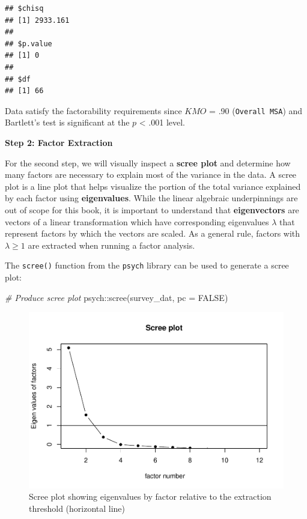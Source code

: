 \documentclass[
]{book}
\newenvironment{Shaded}{\begin{snugshade}}{\end{snugshade}}
\newcommand{\AttributeTok}[1]{\textcolor[rgb]{0.77,0.63,0.00}{#1}}
\newcommand{\CommentTok}[1]{\textcolor[rgb]{0.56,0.35,0.01}{\textit{#1}}}
\newcommand{\ConstantTok}[1]{\textcolor[rgb]{0.00,0.00,0.00}{#1}}
\newcommand{\FunctionTok}[1]{\textcolor[rgb]{0.00,0.00,0.00}{#1}}
\newcommand{\NormalTok}[1]{#1}
\newcommand{\SpecialCharTok}[1]{\textcolor[rgb]{0.00,0.00,0.00}{#1}}
\begin{document}
\begin{verbatim}
## $chisq
## [1] 2933.161
## 
## $p.value
## [1] 0
## 
## $df
## [1] 66
\end{verbatim}

Data satisfy the factorability requirements since \(KMO\) = .90 (\texttt{Overall\ MSA}) and Bartlett's test is significant at the \(p\) \textless{} .001 level.

\textbf{Step 2: Factor Extraction}

For the second step, we will visually inspect a \textbf{scree plot} and determine how many factors are necessary to explain most of the variance in the data. A scree plot is a line plot that helps visualize the portion of the total variance explained by each factor using \textbf{eigenvalues}. While the linear algebraic underpinnings are out of scope for this book, it is important to understand that \textbf{eigenvectors} are vectors of a linear transformation which have corresponding eigenvalues \(\lambda\) that represent factors by which the vectors are scaled. As a general rule, factors with \(\lambda \ge 1\) are extracted when running a factor analysis.

The \texttt{scree()} function from the \texttt{psych} library can be used to generate a scree plot:

\begin{Shaded}
\begin{Highlighting}[]
\CommentTok{\# Produce scree plot}
\NormalTok{psych}\SpecialCharTok{::}\FunctionTok{scree}\NormalTok{(survey\_dat, }\AttributeTok{pc =} \ConstantTok{FALSE}\NormalTok{)}
\end{Highlighting}
\end{Shaded}

\begin{figure}

{\centering \includegraphics[width=1\linewidth]{The_Fundamentals_of_People_Analytics_files/figure-latex/scree-plot-1} 

}

\caption{Scree plot showing eigenvalues by factor relative to the extraction threshold (horizontal line)}\label{fig:scree-plot}
\end{figure}
\end{document}
